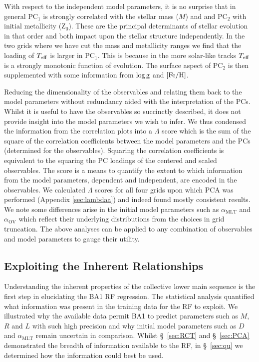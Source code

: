 With respect to the independent model parameters, it is no surprise that in general PC$_1$ is strongly correlated with the stellar mass ($M$) and  and PC$_2$ with initial metallicity (Z$_0$). 
These are the principal determinants of stellar evolution in that order and both impact upon the stellar structure independently.
In the two grids where we have cut the mass and metallicity ranges we find that the loading of $T_{\rm{eff}}$ is larger in PC$_1$.
This is because in the more solar-like tracks $T_{\rm{eff}}$ is a strongly monotonic function of evolution.
The surface aspect of PC$_2$ is then supplemented with some information from  $\log \rm{g}$ and $[\rm{Fe/H}]$.

Reducing the dimensionality of the observables and relating them back to the model parameters without redundancy aided with the interpretation of the PCs. 
Whilst it is useful to have the observables so succinctly described, it does not provide insight into the model parameters we wish to infer. 
We thus condensed the information from the correlation plots into a $\Lambda$ score which 
is the sum of the square of the correlation coefficients  between the model parameters and the PCs (determined for the observables). Squaring the correlation coefficients is equivalent to the squaring the PC loadings of the centered and scaled observables. 
The score is a means to quantify the extent to which information from the model parameters, dependent and independent, are encoded in the observables.
We calculated $\Lambda$ scores for all four grids upon which PCA was performed (Appendix \ref{sec:lambdaa}) and indeed found mostly consistent results. We note some differences arise in the initial model parameters such as $\alpha_{\text{MLT}}$ and $\alpha_{\text{OV}}$ which reflect their underlying 
distributions from the choices in grid truncation. The above analyses can be applied to any combination of observables and model parameters to gauge their utility.



\subsection{Exploiting the Inherent Relationships}

Understanding the inherent properties of the collective lower main sequence is the first step in elucidating the BA1 RF regression. The statistical analysis quantified what information was present in the training data for the RF to exploit. We illustrated why the available data permit BA1 to predict parameters such as $M$, $R$ and $L$ with such high precision and why initial model parameters such as $D$ and $\alpha_{\text{MLT}}$ remain uncertain in comparison. Whilst  \S~\ref{sec:RCT} and \S~\ref{sec:PCA} demonstrated the breadth of information available to the RF, in \S~\ref{sec:qu} we determined how the information could best be used. 

